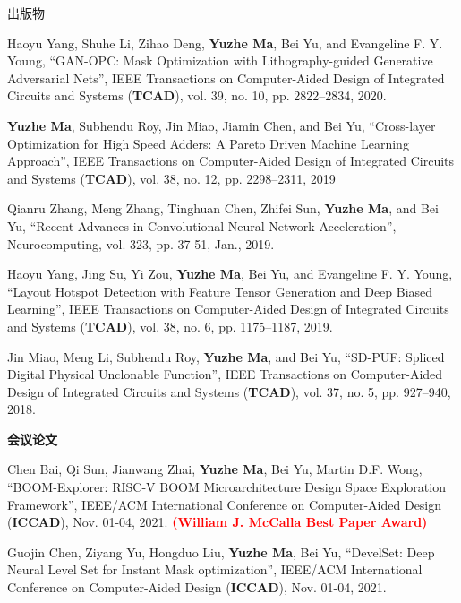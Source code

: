 \begin{rSection}{出版物}
\begin{description}[font=\normalfont]
\item[{[J5]}]{
    Haoyu Yang, Shuhe Li, Zihao Deng, \textbf{Yuzhe Ma}, Bei Yu, and Evangeline F. Y. Young,
    ``GAN-OPC: Mask Optimization with Lithography-guided Generative Adversarial Nets'',
    IEEE Transactions on Computer-Aided Design of Integrated Circuits and Systems (\textbf{TCAD}), vol. 39, no. 10, pp. 2822--2834, 2020.
}

\item[{[J4]}]{
    \textbf{Yuzhe Ma}, Subhendu Roy, Jin Miao, Jiamin Chen, and Bei Yu,
    ``Cross-layer Optimization for High Speed Adders: A Pareto Driven Machine Learning Approach'',
    IEEE Transactions on Computer-Aided Design of Integrated Circuits and Systems (\textbf{TCAD}), vol. 38, no. 12, pp. 2298--2311, 2019
}

\item[{[J3]}]{
    Qianru Zhang, Meng Zhang, Tinghuan Chen, Zhifei Sun, \textbf{Yuzhe Ma}, and Bei Yu,
    ``Recent Advances in Convolutional Neural Network Acceleration'',
    Neurocomputing, vol. 323, pp. 37-51, Jan., 2019.
}

\item[{[J2]}]{
    Haoyu Yang, Jing Su, Yi Zou, \textbf{Yuzhe Ma}, Bei Yu, and Evangeline F. Y. Young,
    ``Layout Hotspot Detection with Feature Tensor Generation and Deep Biased Learning'',
    IEEE Transactions on Computer-Aided Design of Integrated Circuits and Systems (\textbf{TCAD}), vol. 38, no. 6, pp. 1175--1187, 2019.
}

\item[{[J1]}]{
    Jin Miao, Meng Li, Subhendu Roy, \textbf{Yuzhe Ma}, and Bei Yu,
    ``SD-PUF: Spliced Digital Physical Unclonable Function'',
    IEEE Transactions on Computer-Aided Design of Integrated Circuits and Systems (\textbf{TCAD}), vol. 37, no. 5, pp. 927--940, 2018.
}
\end{description}


\textbf{会议论文}
\begin{description}[font=\normalfont]

\item [{[C24]}]{
	Chen Bai, Qi Sun, Jianwang Zhai, \textbf{Yuzhe Ma}, Bei Yu, Martin D.F. Wong,
	``BOOM-Explorer: RISC-V BOOM Microarchitecture Design Space Exploration Framework'',
	IEEE/ACM International Conference on Computer-Aided Design (\textbf{ICCAD}), Nov. 01-04, 2021.
	\textcolor{red}{\textbf{(William J. McCalla Best Paper Award)}}
}



\item [{[C23]}]{
    Guojin Chen, Ziyang Yu, Hongduo Liu, \textbf{Yuzhe Ma}, Bei Yu,
    ``DevelSet: Deep Neural Level Set for Instant Mask optimization'',
    IEEE/ACM International Conference on Computer-Aided Design (\textbf{ICCAD}), Nov. 01-04, 2021.
}


\end{description}
\end{rSection}
